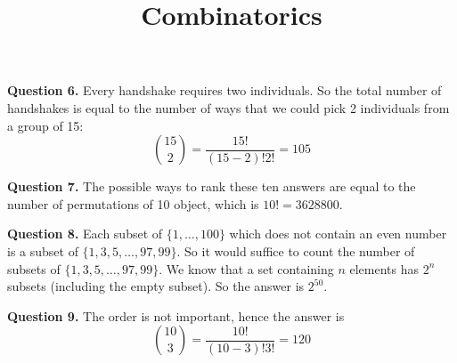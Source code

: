 \documentclass{ximera}
\title{Combinatorics}
\begin{document}
\maketitle

\textbf{Question 6.} Every handshake requires two individuals. So the total number of handshakes is equal to the number of ways that we could pick 2 individuals from a group of 15:
\begin{equation*}
\binom{15}{2} = \frac{15!}{(15 - 2)! 2!} = 105
\end{equation*}

\textbf{Question 7.} The possible ways to rank these ten answers are equal to the number of permutations of 10 object, which is $10! = 3628800$.

\textbf{Question 8.} Each subset of $\{1 , \ldots , 100\}$ which does not contain an even number is a subset of $\{1, 3, 5, \ldots , 97, 99\}$. So it would suffice to count the number of subsets of $\{1, 3, 5, \ldots , 97, 99\}$. We know that a set containing $n$ elements has $2^n$ subsets (including the empty subset). So the answer is $2^{50}$.

\textbf{Question 9.} The order is not important, hence the answer is
\begin{equation*}
\binom{10}{3} = \frac{10!}{(10-3)!3!} = 120
\end{equation*}
\end{document}
